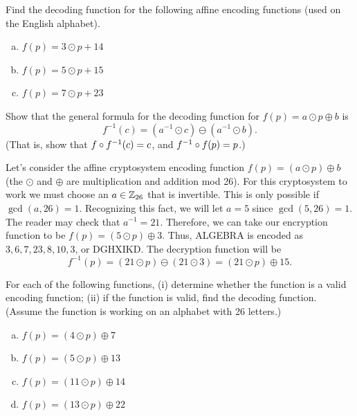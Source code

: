 \begin{exercise}{}
Find the decoding function for the following  affine encoding functions (used on the English alphabet).
\begin{enumerate}[(a)]
\item
$f(p)=3 \odot p + 14$
\item
$f(p)=5 \odot p + 15$
\item
$f(p)=7 \odot p + 23$
\end{enumerate}
\end{exercise}

\begin{exercise}{}
 Show that the  general formula for the decoding function for $f(p) = a \odot p \oplus b$ is
$$
f^{-1}(c) = (a^{-1} \odot c)  \ominus (a^{-1}\odot b).
$$
 (That is, show that $f \circ f^{-1}(c)=c$, and $ f^{-1}\circ  f(p) =  p$.)
\end{exercise}

\begin{example}{}
Let's consider the affine cryptosystem encoding function $f(p) = (a \odot p) \oplus  b$ (the $\odot$ and $\oplus$ are multiplication and addition mod 26).  For
this cryptosystem to work we must choose an $a \in {\Bbb Z}_{26}$
that is invertible. This is only possible if $\gcd(a, 26) = 1$.
Recognizing this fact, we will let $a = 5$ since $\gcd(5, 26) = 1$. The reader may check that $a^{-1} = 21$. Therefore, we can take our
encryption function to be $f(p) = (5 \odot p) \oplus 3$. Thus, ALGEBRA is
encoded as $3, 6, 7, 23, 8, 10, 3$, or DGHXIKD. The decryption
function will be   
$$
f^{-1}(p) = (21 \odot  p) \ominus (21\odot 3)  =(21 \odot  p) \oplus 15.
$$
\end{example}

\begin{exercise}{}
For each of the following functions, (i) determine whether the function is a valid encoding function; (ii) if the function is valid, find the decoding function. (Assume the function is working on an alphabet with 26 letters.)
\begin{enumerate}[(a)]
\item
$f(p) = (4 \odot p) \oplus 7$
\item
$f(p) = (5 \odot p) \oplus 13$
\item
$f(p) = (11 \odot p) \oplus 14$
\item
$f(p) = (13 \odot p) \oplus 22$
\end{enumerate}
\end{exercise}


